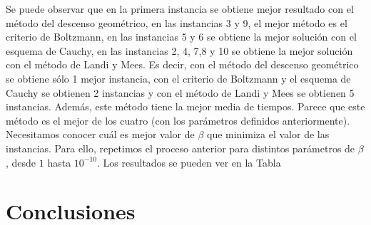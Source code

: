 \documentclass[12pt,a4paper,twoside,openright,titlepage,final]{article}
\begin{document}
Se puede observar que en la primera instancia se obtiene mejor resultado con el método del descenso geométrico, en las instancias 3 y 9, el mejor método es el criterio de Boltzmann, en las instancias 5 y 6 se obtiene la mejor solución con el esquema de Cauchy, en las instancias 2, 4, 7,8 y 10 se obtiene la mejor solución con el método de Landi y Mees. Es decir, con el método del descenso geométrico se obtiene sólo 1 mejor instancia, con el criterio de Boltzmann y el esquema de Cauchy se obtienen 2 instancias y con el método de Landi y Mees se obtienen 5 instancias. Además, este método tiene la mejor media de tiempos. Parece que este método es el mejor de los cuatro (con los parámetros definidos anteriormente).\\

Necesitamos conocer cuál es mejor valor de $\beta$ que minimiza el valor de las instancias. Para ello, repetimos el proceso anterior para distintos parámetros de $\beta$, desde $1$ hasta $10^{-10}$. Los resultados se pueden ver en la Tabla


\section{Conclusiones}

\newpage
\end{document}
